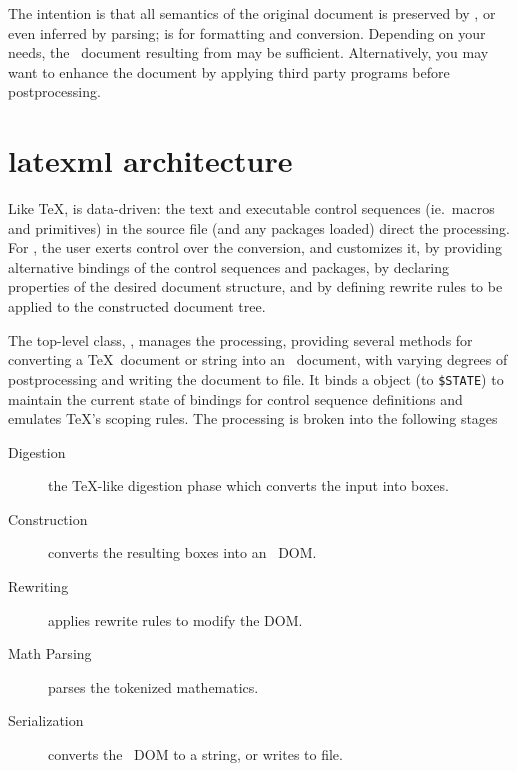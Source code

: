 \documentclass{book}
\newcommand{\ltxcode}{\lstinline[style=latexml]}
\begin{document}
The intention is that all semantics of the original document is
preserved by , or even inferred by parsing;
 is for formatting and conversion.
Depending on your needs, the \LaTeXML\ document resulting from  may be
sufficient. Alternatively, you may want to enhance the document
by applying third party programs before postprocessing.

\section{latexml architecture}\label{latexmlarchitecture}
%
Like \TeX,  is data-driven: the text and executable control
sequences (ie.~macros and primitives)
in the source file (and any packages loaded) direct the processing.
For \LaTeXML, the user exerts control over the conversion, and customizes it, by 
providing alternative bindings of the control sequences and packages,
by declaring properties of the desired document structure,
and by defining rewrite rules to be applied to the constructed document tree.

The top-level class, , manages the processing, providing several methods
for converting a \TeX\ document or string into an \XML\ document, with varying degrees
of postprocessing and writing the document to file.
It binds a  object (to \ltxcode|$STATE|) to maintain the current state
of bindings for control sequence definitions and emulates \TeX's scoping rules.
The processing is broken into the following stages
\begin{description}
   \item[Digestion] the \TeX-like digestion phase which converts the input into boxes.
   \item[Construction] converts the resulting boxes into an \XML\ DOM.
   \item[Rewriting] applies rewrite rules to modify the DOM.
   \item[Math Parsing] parses the tokenized mathematics.
   \item[Serialization] converts the \XML\ DOM to a string, or writes to file.
\end{description}

\end{document}
